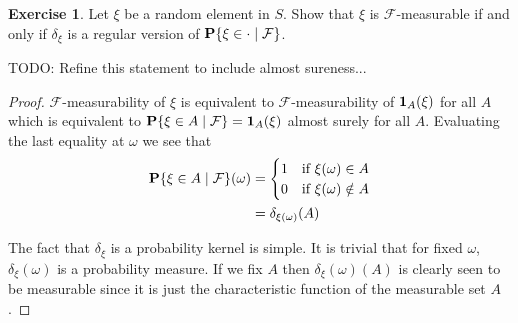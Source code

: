 \documentclass{amsart}
\theoremstyle{remark}
\theoremstyle{definition}
\newtheorem{ex}[thm]{Exercise}
\begin{document}
\begin{ex}Let $\xi$ be a random element in $S$.  Show that $\xi$ is
  $\mathcal{F}$-measurable if and only if $\delta_\xi$ is a regular
  version of 
  $\cprobability{\mathcal{F}}{\xi \in \cdot}$.

TODO: Refine this statement to include almost sureness...
\end{ex}
\begin{proof}
$\mathcal{F}$-measurability of $\xi$ is equivalent to
$\mathcal{F}$-measurability of $\characteristic{A}(\xi)$ for all $A$
which is equivalent to $\cprobability{\mathcal{F}}{\xi \in A} =
\characteristic{A}(\xi)$ almost surely for all $A$.  Evaluating the
last equality at $\omega$ we see that 
\begin{align*}
\cprobability{\mathcal{F}}{\xi \in A}(\omega) &= \begin{cases}
1 & \text{if $\xi(\omega) \in A$} \\
0 & \text{if $\xi(\omega) \notin A$} 
\end{cases}\\
&= \delta_{\xi(\omega)}(A)
\end{align*}

The fact that $\delta_\xi$ is a probability kernel is simple.  It is
trivial that for fixed $\omega$, $\delta_\xi(\omega)$ is a probability
measure.  If we fix $A$ then $\delta_\xi(\omega)(A)$ is clearly seen
to be measurable since it is just the characteristic function of the
measurable set $A$.
\end{proof}
\end{document}
